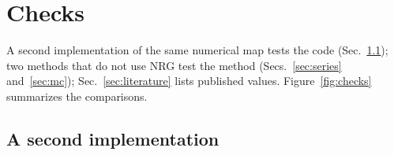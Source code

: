 \documentclass[10pt,a4paper]{article}
\newcommand{\Ds}{\Delta_\sigma}
\newcommand{\DE}{\Delta_E}
\newcommand{\dtot}{\delta_{\rm tot}}
\begin{document}
\begin{table}[ht]\centering\small
\caption{$y_t=1-\DE$ near $s=1$ against the leading form $\sqrt{2\delta}$ ($\delta=1-s=2\Ds$) and the next-to-leading form
$\sqrt{2\delta}-\delta/4$ of Refs.~\cite{BLMV25,BLMV26}; the remainder in units of $\delta^{3/2}$, and $\dtot$ in the same units (the
uncertainty of the remainder).}\label{tab:s1}

\end{table}

\section{Checks}\label{sec:checks}
A second implementation of the same numerical map tests the code (Sec.~\ref{sec:indep}); two methods that do not use NRG test the
method (Secs.~\ref{sec:series} and~\ref{sec:mc}); Sec.~\ref{sec:literature} lists published values. Figure~\ref{fig:checks} summarizes
the comparisons.

\subsection{A second implementation}\label{sec:indep}
\end{document}
